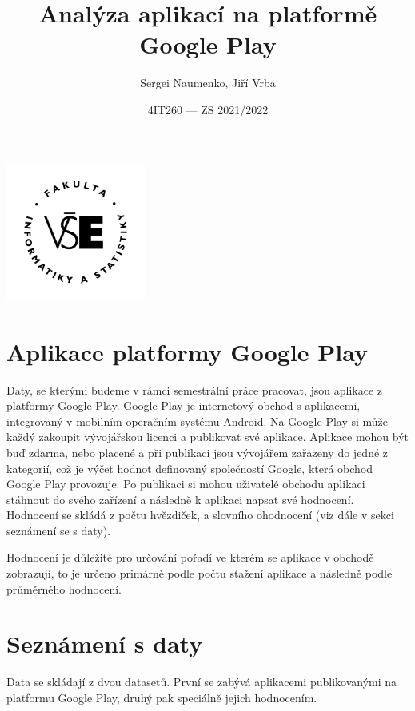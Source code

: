 \documentclass{article}
\title{Analýza aplikací na platformě Google Play}
\author{Sergei Naumenko, Jiří Vrba}
\date{4IT260 --- ZS 2021/2022}
\begin{document}
\maketitle

\begin{minipage}{\dimexpr \linewidth - 15pt \relax}
            \centering
\includegraphics[width=130pt]{FIS_2_logo_cb_rgb.png}
\end{minipage}

\newpage

\section*{Aplikace platformy Google Play}
\par
Daty, se kterými budeme v rámci semestrální práce pracovat, jsou aplikace z platformy Google Play. Google Play je internetový obchod s aplikacemi, 
integrovaný v mobilním operačním systému Android. Na Google Play si může každý zakoupit vývojářskou
licenci a publikovat své aplikace.
Aplikace mohou být buď zdarma, nebo placené a při publikaci jsou vývojářem zařazeny do jedné z
kategorií, což je výčet hodnot definovaný společností Google, která obchod Google Play provozuje.
Po publikaci si mohou uživatelé obchodu aplikaci stáhnout do 
svého zařízení a následně k aplikaci napsat své hodnocení. Hodnocení se skládá z počtu hvězdiček,
a slovního ohodnocení (viz dále v sekci seznámení se s daty).

Hodnocení je důležité pro určování pořadí ve kterém se aplikace v obchodě zobrazují, to je určeno primárně podle počtu stažení aplikace a následně podle průměrného hodnocení.

\section*{Seznámení s daty}
\par
Data se skládají z dvou datasetů. První se zabývá aplikacemi publikovanými na platformu Google Play, druhý pak speciálně jejich hodnocením.
\end{document}
